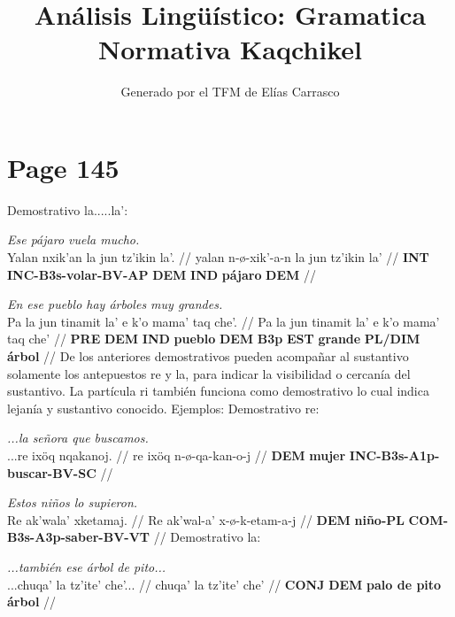 \documentclass{article}%
\title{Análisis Lingüístico: Gramatica Normativa Kaqchikel}%
\author{Generado por el TFM de Elías Carrasco}%
\begin{document}
%
\normalsize%
\maketitle%
\section{Page 145}%
\label{sec:Page145}%
Demostrativo la.....la': %
\par\medskip%
\ex
\textit{Ese pájaro vuela mucho.} \\
\begingl
\gla Yalan nxik'an la jun tz'ikin la'. //
\glb yalan n-ø-xik'-a-n la jun tz'ikin la' //
\glc \textbf{INT} \textbf{INC-B3s-volar-BV-AP} \textbf{DEM} \textbf{IND} \textbf{pájaro} \textbf{DEM} //
\endgl
\xe
%
\medskip%
\par\medskip%
\ex
\textit{En ese pueblo hay árboles muy grandes.} \\
\begingl
\gla Pa la jun tinamit la' e k'o mama' taq che'. //
\glb Pa la jun tinamit la' e k'o mama' taq che' //
\glc \textbf{PRE} \textbf{DEM} \textbf{IND} \textbf{pueblo} \textbf{DEM} \textbf{B3p} \textbf{EST} \textbf{grande} \textbf{PL/DIM} \textbf{árbol} //
\endgl
\xe
%
\medskip%
De los anteriores demostrativos pueden acompañar al sustantivo solamente los antepuestos re y la, para indicar la visibilidad o cercanía del sustantivo. La partícula ri también funciona como demostrativo lo cual indica lejanía y sustantivo conocido. %
Ejemplos: %
Demostrativo re: %
\par\medskip%
\ex
\textit{...la señora que buscamos.} \\
\begingl
\gla ...re ixöq nqakanoj. //
\glb re ixöq n-ø-qa-kan-o-j //
\glc \textbf{DEM} \textbf{mujer} \textbf{INC-B3s-A1p-buscar-BV-SC} //
\endgl
\xe
%
\medskip%
\par\medskip%
\ex
\textit{Estos niños lo supieron.} \\
\begingl
\gla Re ak'wala' xketamaj. //
\glb Re ak'wal-a' x-ø-k-etam-a-j //
\glc \textbf{DEM} \textbf{niño-PL} \textbf{COM-B3s-A3p-saber-BV-VT} //
\endgl
\xe
%
\medskip%
Demostrativo la: %
\par\medskip%
\ex
\textit{...también ese árbol de pito...} \\
\begingl
\gla ...chuqa' la tz'ite' che'... //
\glb chuqa' la tz'ite' che' //
\glc \textbf{CONJ} \textbf{DEM} \textbf{palo de pito} \textbf{árbol} //
\endgl
\xe
%
\medskip

%
\end{document}
